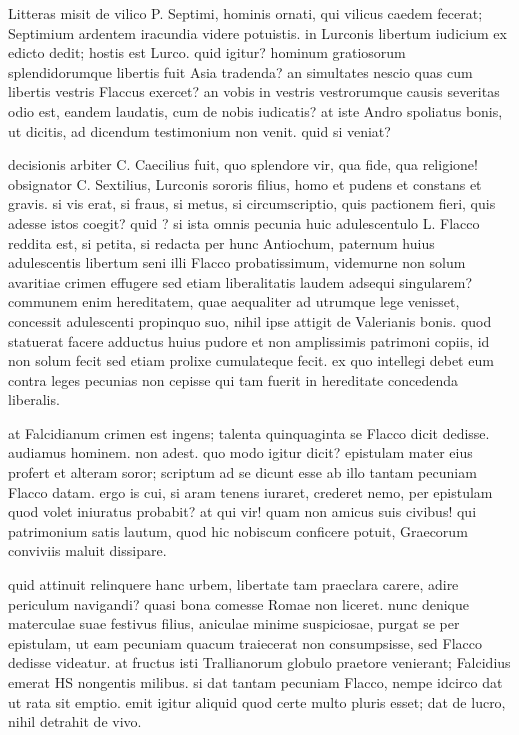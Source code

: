 Litteras misit de vilico P. Septimi, hominis ornati, qui vilicus caedem fecerat; Septimium ardentem iracundia videre potuistis. in Lurconis libertum iudicium ex edicto dedit; hostis est Lurco. quid igitur? hominum gratiosorum splendidorumque libertis fuit Asia tradenda? an simultates nescio quas cum libertis vestris Flaccus exercet? an vobis in vestris vestrorumque causis severitas odio est, eandem laudatis, cum de nobis iudicatis? at iste Andro spoliatus bonis, ut dicitis, ad dicendum testimonium non venit. quid si veniat?

 decisionis arbiter C. Caecilius fuit, quo splendore vir, qua fide, qua religione! obsignator C. Sextilius, Lurconis sororis filius, homo et pudens et constans et gravis. si vis erat, si fraus, si metus, si circumscriptio, quis pactionem fieri, quis adesse istos coegit? quid ? si ista omnis pecunia huic adulescentulo L. Flacco reddita est, si petita, si redacta per hunc Antiochum, paternum huius adulescentis libertum seni illi Flacco probatissimum, videmurne non solum avaritiae crimen effugere sed etiam liberalitatis laudem adsequi singularem? communem enim hereditatem, quae aequaliter ad utrumque lege venisset, concessit adulescenti propinquo suo, nihil ipse attigit de Valerianis bonis. quod statuerat facere adductus huius pudore et non amplissimis patrimoni copiis, id non solum fecit sed etiam prolixe cumulateque fecit. ex quo intellegi debet eum contra leges pecunias non cepisse qui tam fuerit in hereditate concedenda liberalis.

 at Falcidianum crimen est ingens; talenta quinquaginta se Flacco dicit dedisse. audiamus hominem. non adest. quo modo igitur dicit? epistulam mater eius profert et alteram soror; scriptum ad se dicunt esse ab illo tantam pecuniam Flacco datam. ergo is cui, si aram tenens iuraret, crederet nemo, per epistulam quod volet iniuratus probabit? at qui vir! quam non amicus suis civibus! qui patrimonium satis lautum, quod hic nobiscum conficere potuit, Graecorum conviviis maluit dissipare.

 quid attinuit relinquere hanc urbem, libertate tam praeclara carere, adire periculum navigandi? quasi bona comesse Romae non liceret. nunc denique materculae suae festivus filius, aniculae minime suspiciosae, purgat se per epistulam, ut eam pecuniam quacum traiecerat non consumpsisse, sed Flacco dedisse videatur. at fructus isti Trallianorum globulo praetore venierant; Falcidius emerat HS nongentis milibus. si dat tantam pecuniam Flacco, nempe idcirco dat ut rata sit emptio. emit igitur aliquid quod certe multo pluris esset; dat de lucro, nihil detrahit de vivo.


